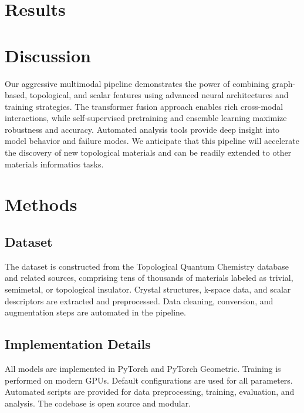 \documentclass[12pt]{article}
\begin{document}
\section{Results}

\section{Discussion}
Our aggressive multimodal pipeline demonstrates the power of combining graph-based, topological, and scalar features using advanced neural architectures and training strategies. The transformer fusion approach enables rich cross-modal interactions, while self-supervised pretraining and ensemble learning maximize robustness and accuracy. Automated analysis tools provide deep insight into model behavior and failure modes. We anticipate that this pipeline will accelerate the discovery of new topological materials and can be readily extended to other materials informatics tasks.

\section{Methods}
\subsection{Dataset}
The dataset is constructed from the Topological Quantum Chemistry database and related sources, comprising tens of thousands of materials labeled as trivial, semimetal, or topological insulator. Crystal structures, k-space data, and scalar descriptors are extracted and preprocessed. Data cleaning, conversion, and augmentation steps are automated in the pipeline.

\subsection{Implementation Details}
All models are implemented in PyTorch and PyTorch Geometric. Training is performed on modern GPUs. Default configurations are used for all parameters. Automated scripts are provided for data preprocessing, training, evaluation, and analysis. The codebase is open source and modular.
\end{document}
